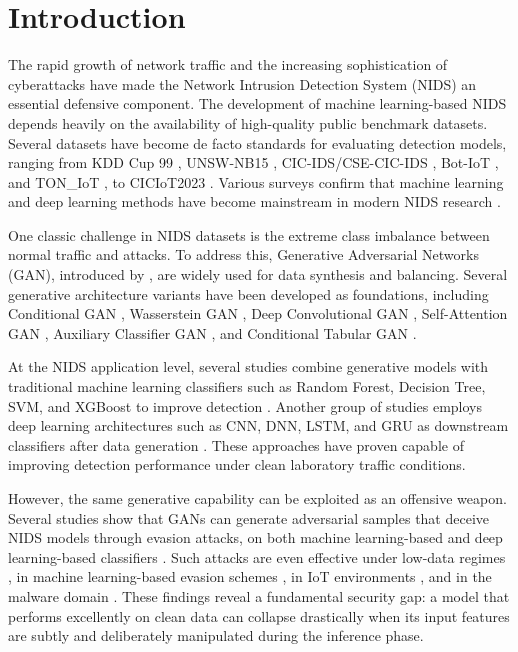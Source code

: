 \documentclass[11pt, a4paper]{article}
\begin{document}
\section{Introduction}
The rapid growth of network traffic and the increasing sophistication of cyberattacks have made the Network Intrusion Detection System (NIDS) an essential defensive component. The development of machine learning-based NIDS depends heavily on the availability of high-quality public benchmark datasets. Several datasets have become de facto standards for evaluating detection models, ranging from KDD Cup 99 \citep{ref_kdd}, UNSW-NB15 \citep{ref_unsw}, CIC-IDS/CSE-CIC-IDS \citep{ref_cicids}, Bot-IoT \citep{ref_botiot}, and TON\_IoT \citep{ref_toniot}, to CICIoT2023 \citep{ref_ciciot}. Various surveys confirm that machine learning and deep learning methods have become mainstream in modern NIDS research \citep{ref_review_gan, ref_survey_malware, ref_tutorial_gan}.

One classic challenge in NIDS datasets is the extreme class imbalance between normal traffic and attacks. To address this, Generative Adversarial Networks (GAN), introduced by \citet{ref_gan}, are widely used for data synthesis and balancing. Several generative architecture variants have been developed as foundations, including Conditional GAN \citep{ref_cgan}, Wasserstein GAN \citep{ref_wgan}, Deep Convolutional GAN \citep{ref_dcgan}, Self-Attention GAN \citep{ref_sagan}, Auxiliary Classifier GAN \citep{ref_acgan}, and Conditional Tabular GAN \citep{ref_ctgan}.

At the NIDS application level, several studies combine generative models with traditional machine learning classifiers such as Random Forest, Decision Tree, SVM, and XGBoost to improve detection \citep{ref_mari, ref_kumar, ref_ctgan_ids, ref_mcgan, ref_syngan, ref_cegan}. Another group of studies employs deep learning architectures such as CNN, DNN, LSTM, and GRU as downstream classifiers after data generation \citep{ref_tcn, ref_speacgan, ref_qgan, ref_tmggan, ref_park, ref_fewshot}. These approaches have proven capable of improving detection performance under clean laboratory traffic conditions.

However, the same generative capability can be exploited as an offensive weapon. Several studies show that GANs can generate adversarial samples that deceive NIDS models through evasion attacks, on both machine learning-based and deep learning-based classifiers \citep{ref_attackgan, ref_sganids, ref_idsgan}. Such attacks are even effective under low-data regimes \citep{ref_evasiongan}, in machine learning-based evasion schemes \citep{ref_demgan}, in IoT environments \citep{ref_iotevasion}, and in the malware domain \citep{ref_aagan, ref_gleam}. These findings reveal a fundamental security gap: a model that performs excellently on clean data can collapse drastically when its input features are subtly and deliberately manipulated during the inference phase.
\end{document}
